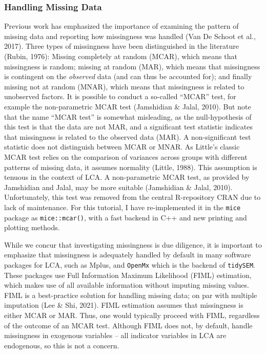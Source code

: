 \documentclass[
  ,man,floatsintext]{apa6}
\begin{document}
\hypertarget{handling-missing-data}{%
\subsubsection{Handling Missing Data}\label{handling-missing-data}}

Previous work has emphasized the importance of examining
the pattern of missing data and
reporting how missingness was handled
(Van De Schoot et al., 2017).
Three types of missingness have been distinguished
in the literature (Rubin, 1976):
Missing completely at random (MCAR),
which means that missingness is random;
missing at random (MAR),
which means that missingness is contingent on the \emph{observed} data
(and can thus be accounted for);
and finally missing not at random (MNAR),
which means that missingness is related to unobserved factors.
It is possible to conduct a so-called ``MCAR'' test,
for example the non-parametric MCAR test (Jamshidian \& Jalal, 2010).
But note that the name ``MCAR test'' is somewhat misleading,
as the null-hypothesis of this test is that the data are not MAR,
and a significant test statistic indicates that
missingness is related to the observed data (MAR).
A non-significant test statistic does not distinguish between MCAR or MNAR.
As Little's classic MCAR test relies on
the comparison of variances across groups
with different patterns of missing data,
it assumes normality (Little, 1988).
This assumption is tenuous in the context of LCA.
A non-parametric MCAR test,
as provided by Jamshidian and Jalal,
may be more suitable (Jamshidian \& Jalal, 2010).
Unfortunately, this test was removed from the central R-repository CRAN
due to lack of maintenance.
For this tutorial, I have re-implemented it in the \texttt{mice} package
as \texttt{mice::mcar()},
with a fast backend in C++ and new printing and plotting methods.

While we concur that investigating missingness is due diligence,
it is important to emphasize that
missingness is adequately handled by default in many software packages for LCA,
such as Mplus, and \texttt{OpenMx} which is the backend of \texttt{tidySEM}.
These packages use Full Information Maximum Likelihood (FIML) estimation,
which makes use of all available information without imputing missing values.
FIML is a best-practice solution for handling missing data;
on par with multiple imputation (Lee \& Shi, 2021).
FIML estimation assumes that missingness is either MCAR or MAR.
Thus, one would typically proceed with FIML,
regardless of the outcome of an MCAR test.
Although FIML does not, by default, handle missingness in exogenous variables
-- all indicator variables in LCA are endogenous,
so this is not a concern.
\end{document}
